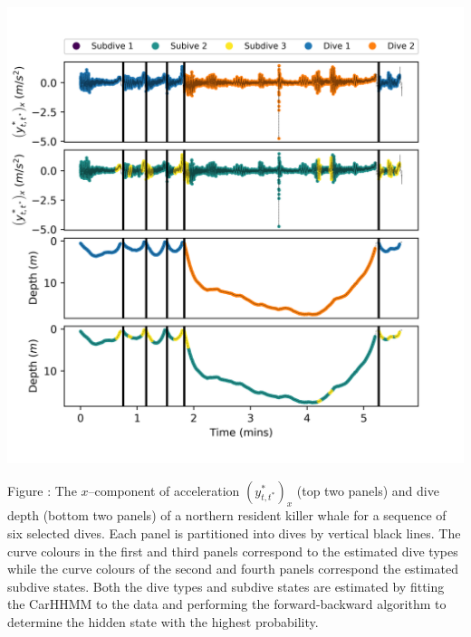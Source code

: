 \documentclass{article}
\begin{document}
        \begin{center}
        \includegraphics[width=6in]{../Plots/CarHHMM1_decoded_dives.png}
        \end{center}
        
        \noindent Figure : The $x$--component of acceleration $\left(y^*_{t,t^*}\right)_x$ (top two panels) and dive depth (bottom two panels) of a northern resident killer whale for a sequence of six selected dives. Each panel is partitioned into dives by vertical black lines. The curve colours in the first and third panels correspond to the estimated dive types while the curve colours of the second and fourth panels correspond the estimated subdive states. Both the dive types and subdive states are estimated by fitting the CarHHMM to the data and performing the forward-backward algorithm to determine the hidden state with the highest probability.
        \addtocounter{fignum}{1}
        
\end{document}
